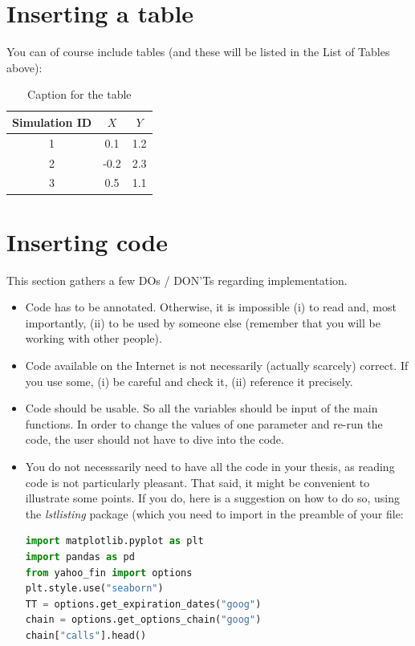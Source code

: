 \documentclass[a4paper, twoside]{report}
\theoremstyle{definition}
\numberwithin{equation}{section}
\begin{document}

\section{Inserting a table}
You can of course include tables (and these will be listed in the List of Tables above):

\begin{table}[h!]
  \centering
  \begin{tabular}{|c|c|c|}
    \hline
    Simulation ID & $X$  & $Y$ \\
    \hline
    1             & 0.1  & 1.2 \\
    2             & -0.2 & 2.3 \\
    3             & 0.5  & 1.1 \\
    \hline
  \end{tabular}
  \caption{Caption for the table}
\end{table}

\section{Inserting code}
This section gathers a few DOs / DON'Ts regarding implementation.

\begin{itemize}
  \item Code has to be annotated. Otherwise, it is impossible (i) to read and, most importantly,
        (ii) to be used by someone else (remember that you will be working with other people).
  \item Code available on the Internet is not necessarily (actually scarcely) correct.
        If you use some, (i) be careful and check it, (ii) reference it precisely.
  \item Code should be usable. So all the variables should be input of the main functions.
        In order to change the values of one parameter and re-run the code, the user should not have to dive into the code.
  \item You do not necesssarily need to have all the code in your thesis, as reading code is not particularly pleasant. That said, it might be convenient to illustrate some points. If you do, here is a suggestion on how to do so, using the \emph{lstlisting} package (which you need to import in the preamble of your file:
        \begin{lstlisting}[language=python,numbers=none]
import matplotlib.pyplot as plt
import pandas as pd
from yahoo_fin import options
plt.style.use("seaborn")
TT = options.get_expiration_dates("goog")
chain = options.get_options_chain("goog")
chain["calls"].head()
\end{lstlisting}
\end{itemize}
\end{document}
